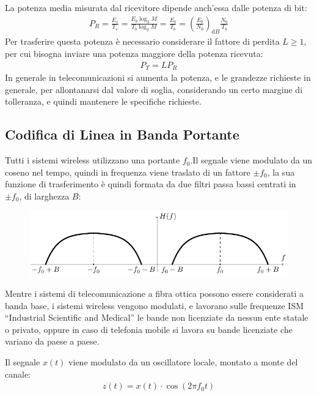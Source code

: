 \documentclass{article}
\newcommand{\df}{\mathrm{d}}
\numberwithin{equation}{subsection}
\begin{document}
La potenza media misurata dal ricevitore dipende anch'essa dalle potenza di bit:
\begin{gather*}
    P_R=\displaystyle\frac{E_s}{T_s}=\frac{E_b\log_2M}{T_b\log_2M}=\frac{E_b}{T_b}=\left(\frac{E_b}{N_0}\right)_{\df B}\frac{N_0}{T_b}
\end{gather*}
Per trasferire questa potenza è necessario considerare il fattore di perdita $L\geq 1$, per cui bisogna inviare una potenza maggiore della potenza ricevuta:
\begin{gather*}
    P_T=LP_R
\end{gather*}
In generale in telecomunicazioni si aumenta la potenza, e le grandezze richieste in generale, per allontanarsi dal valore di soglia, considerando un certo margine di 
tolleranza, e quindi mantenere le specifiche richieste. 

\subsection{Codifica di Linea in Banda Portante}


Tutti i sistemi wireless utilizzano una portante $f_0$.Il segnale viene modulato da un coseno nel tempo, quindi in frequenza viene 
traslato di un fattore $\pm f_0$, la sua funzione di trasferimento è quindi formata da due filtri passa bassi centrati in $\pm f_0$, di larghezza $B$:
\begin{figure}[H]%
    \centering
    \includegraphics{portante.pdf}%
\end{figure}
Mentre i sistemi di telecomunicazione a fibra ottica possono essere considerati a banda base, i sistemi wireless vengono modulati, e lavorano sulle frequenze ISM ``Industrial Scientific and Medical'' 
le bande non licenziate da nessun ente statale o privato, oppure in caso di telefonia mobile si lavora su bande licenziate che variano da paese a paese. 

Il segnale $x(t)$ viene modulato da un oscillatore locale, montato a monte del canale:
\begin{gather*}
    z(t)=x(t)\cdot\cos(2\pi f_0t)
\end{gather*}
\end{document}
